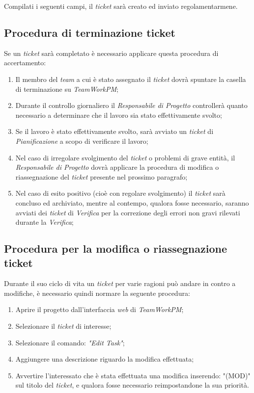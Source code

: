 Compilati i seguenti campi, il \textit{ticket} sarà creato ed inviato regolamentarmene.

\subsection{Procedura di terminazione ticket}
Se un \textit{ticket} sarà completato è necessario applicare questa procedura di accertamento:
\begin{enumerate}
\item Il membro del \textit{team} a cui è stato assegnato il \textit{ticket} dovrà spuntare la casella di terminazione su \textit{TeamWorkPM};
\item Durante il controllo giornaliero il \textit{Responsabile di Progetto} controllerà quanto necessario a determinare che il lavoro sia stato effettivamente svolto;
\item Se il lavoro è stato effettivamente svolto, sarà avviato un \textit{ticket} di \emph{Pianificazione} a scopo di verificare il lavoro;
\item Nel caso di irregolare svolgimento del \textit{ticket} o problemi di grave entità, il \textit{Responsabile di Progetto} dovrà applicare la procedura di modifica o riassegnazione del \textit{ticket} presente nel prossimo paragrafo;
\item Nel caso di esito positivo (cioè con regolare svolgimento) il \textit{ticket} sarà concluso ed archiviato, mentre al contempo, qualora fosse necessario, saranno avviati dei \textit{ticket} di \emph{Verifica} per la correzione degli errori non gravi rilevati durante la \textit{Verifica};

\end{enumerate}

\subsection{Procedura per la modifica o riassegnazione ticket} 
Durante il suo ciclo di vita un \textit{ticket} per varie ragioni può andare in contro a modifiche, è necessario quindi normare la seguente procedura:
\begin{enumerate}
\item Aprire il progetto dall'interfaccia \textit{web} di \textit{TeamWorkPM};
\item Selezionare il \textit{ticket} di interesse;
\item Selezionare il comando: \emph{"Edit Task"};
\item Aggiungere una descrizione riguardo la modifica effettuata;
\item Avvertire l'interessato che è stata effettuata una modifica inserendo: "(MOD)" sul titolo del \textit{ticket}, e qualora fosse necessario reimpostandone la sua priorità.
\end{enumerate}
